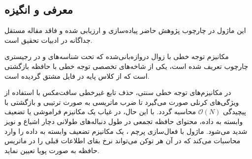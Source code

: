\subsection{معرفی و انگیزه}
این ماژول در چارچوب پژوهش حاضر پیاده‌سازی و ارزیابی شده و فاقد مقاله مستقل جداگانه در ادبیات تحقیق است.

مکانیزم توجه خطی با زوال دروازه‌بانی‌شده  که تحت شناسه‌های  و  در رجیستری چارچوب تعریف شده است، یکی از شاخه‌های تخصصی توجه خطی با حافظه بازگشتی است که از کلاس پایه  در فایل  مشتق گردیده است.

در مکانیزم‌های توجه خطی سنتی، حذف تابع غیرخطی سافت‌مکس با استفاده از ویژگی‌های کرنلی صورت می‌گیرد تا ضرب ماتریسی به صورت ترتیبی و بازگشتی با پیچیدگی $\mathcal{O}(N)$ محاسبه گردد. با این حال، در غیاب یک مکانیزم فراموشی یا تضعیف وابسته به داده، محتوای حافظه تجمعی در طول دنباله‌های طولانی دچار اشباع و نویز شدید می‌شود. ماژول  با فعال‌سازی پرچم ، یک مکانیزم تضعیف وابسته به داده  را وارد محاسبات می‌کند که در آن هر توکن می‌تواند نرخ بقای اطلاعات قبلی را در ماتریس حافظه به صورت پویا تعیین نماید.
